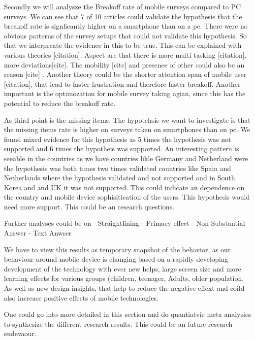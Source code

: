 Secondly we will analysze the Breakoff rate of mobile surveys compared to PC surveys. We can see that 7 of 10 articles could validate the hypothesis that the breakoff rate is signficantly higher on a smartphone than on a pc. There were no obvious patterns of the survey setups that could not validate this hypothesis. So that we interpreate the evidence in this to be true. This can be explained with various theories [citation]. Aspect are that there is more multi tasking [citation], more deviations[cite]. The mobility [cite] and presence of other could also be an reason [cite] . Another theory could be the shorter attention span of mobile user [citation], that lead to faster frustration and therefore faster breakoff. Another important is the optimozation for mobile survey taking agian, since this has the potential to reduce the breakoff rate. 

As third point is the missing items. The hypotehsis we want to investigate is that the missing items rate is higher on surveys taken on smartphones than on pc. We found mixed evidence for this hypothesis as 5 times the hypothesis was not supported and 6 times the hypotheis was supported. An interesting pattern is seeable in the countries as we have countries likle Germany and Netherland were the hypothesis was both times two times validated countries like Spain and Netherlands where the hypothesis validated and not supported and in South Korea and and UK it was not supported. This could indicate an dependence on the country and mobile device sophisitication of the users. This hypothesis would need more support. This could be an research questions. 

Further analyses could be on
- Straightlining
- Primacy effect
- Non Substantial Answer
- Text Anwser


We have to view this results as temporary snapshot of the behavior, as our behaviour around mobile device is changing based on a rapidly developing development of the technology with ever new helps, large screen size and more learning effects for various groups (children, teenager, Adults, older population. As well as new design insights, that help to reduce the negative effext and coild also increase positive effects of mobile technologies.

One could go into more detailed in this section and do quantiatvie meta analysies to synthesize the different research results. This could be an future research endevaour. 
